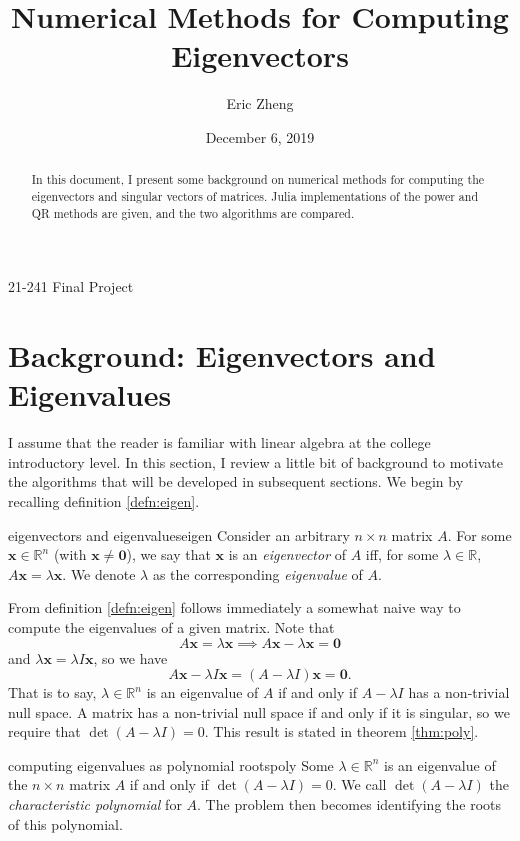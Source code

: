 \documentclass{article}
\title{Numerical Methods for Computing Eigenvectors}
\author{Eric Zheng}
\date{December 6, 2019}
\makeatletter
\renewcommand{\maketitle}{
  \begin{center}
  {\vspace*{10mm}\LARGE\@title\par}
  {\vspace{7mm}\large\@author\par}
  {\vspace{1mm}21-241 Final Project\par}
  {\vspace{3mm}\large\@date\vspace{8mm}}
  \end{center}
}
\let\vec\mathbf
\makeatother
\begin{document}
\maketitle

\begin{abstract}
  In this document, I present some background on numerical methods for computing
  the eigenvectors and singular vectors of matrices. Julia implementations of
  the power and QR methods are given, and the two algorithms are compared.
\end{abstract}

\tableofcontents

\section{Background: Eigenvectors and Eigenvalues}
I assume that the reader is familiar with linear algebra at the college introductory level. In this section, I review a little bit of background to motivate the algorithms that will be developed in subsequent sections. We begin by recalling definition \ref{defn:eigen}.

\begin{definition}{eigenvectors and eigenvalues}{eigen}
  Consider an arbitrary $n \times n$ matrix $A$. For some $\vec{x} \in \mathbb{R}^n$ (with $\vec{x} \neq \vec{0}$), we say that $\vec{x}$ is an \textit{eigenvector} of $A$ iff, for some $\lambda \in \mathbb{R}$, $A\vec{x} = \lambda\vec{x}$. We denote $\lambda$ as the corresponding \textit{eigenvalue} of $A$.
\end{definition}

From definition \ref{defn:eigen} follows immediately a somewhat naive way to compute the eigenvalues of a given matrix. Note that
\begin{equation*}
  A\vec{x} = \lambda\vec{x} \implies A\vec{x} - \lambda\vec{x} = \vec{0}
\end{equation*}
and $\lambda\vec{x} = \lambda I \vec{x}$, so we have
\begin{equation*}
  A\vec{x} - \lambda I \vec{x} = (A - \lambda I)\vec{x} = \vec{0}.
\end{equation*}
That is to say, $\lambda \in \mathbb{R}^n$ is an eigenvalue of $A$ if and only if $A - \lambda I$ has a non-trivial null space. A matrix has a non-trivial null space if and only if it is singular, so we require that $\det(A - \lambda I) = 0$. This result is stated in theorem \ref{thm:poly}.

\begin{theorem}{computing eigenvalues as polynomial roots}{poly}
  Some $\lambda \in \mathbb{R}^n$ is an eigenvalue of the $n \times n$ matrix $A$ if and only if $\det (A - \lambda I) = 0$. We call $\det (A - \lambda I)$ the \textit{characteristic polynomial} for $A$. The problem then becomes identifying the roots of this polynomial.
\end{theorem}
\end{document}
